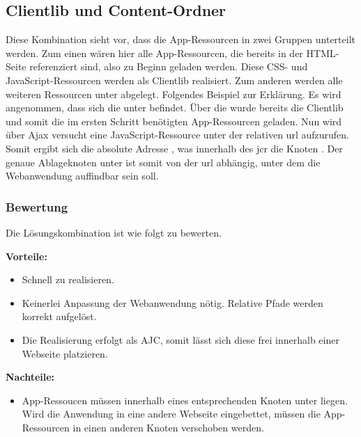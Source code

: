 \subsection{Clientlib und Content-Ordner}
Diese Kombination sieht vor, dass die App-Ressourcen in zwei Gruppen unterteilt werden. Zum einen wären hier alle App-Ressourcen, die bereits in der HTML-Seite referenziert sind, also zu Beginn geladen werden. Diese CSS- und JavaScript-Ressourcen werden als Clientlib realisiert. Zum anderen werden alle weiteren Ressourcen unter  abgelegt. 
Folgendes Beispiel zur Erklärung. Es wird angenommen, dass sich die \ajc unter  befindet. Über die \ajc wurde bereits die Clientlib und somit die im ersten Schritt benötigten App-Ressourcen geladen. Nun wird über Ajax versucht eine JavaScript-Ressource unter der relativen \ac{url}  aufzurufen. Somit ergibt sich die absolute Adresse , was innerhalb des \ac{jcr} die Knoten . Der genaue Ablageknoten unter  ist somit von der \ac{url} abhängig, unter dem die Webanwendung auffindbar sein soll.

\subsubsection{Bewertung}

Die Lösungskombination ist wie folgt zu bewerten.

\begin{minipage}[t]{0.5\textwidth}
	\textbf{Vorteile:}
	\begin{itemize}
		\item Schnell zu realisieren.
		\item Keinerlei Anpassung der Webanwendung nötig. Relative Pfade werden korrekt aufgelöst.
		\item Die Realisierung erfolgt als AJC, somit lässt sich diese frei innerhalb einer Webseite platzieren.
	\end{itemize}
\end{minipage}
\begin{minipage}[t]{0.5\textwidth}
	\textbf{Nachteile:}
	\begin{itemize}
		\item App-Ressoucen müssen innerhalb eines entsprechenden Knoten unter  liegen. Wird die Anwendung in eine andere Webseite eingebettet, müssen die App-Ressourcen in einen anderen Knoten verschoben werden.
	\end{itemize}
\end{minipage}